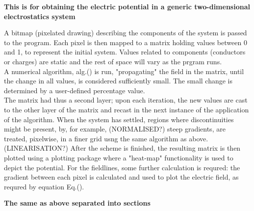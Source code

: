 \documentclass{article}
\begin{document}
  \noindent\textbf{This is for obtaining the electric potential in a generic two-dimensional electrostatics system}

  \vspace{5mm}

	A bitmap (pixelated drawing) describing the components of the system is passed to the program. Each pixel is then 
	 mapped to a matrix holding values between 0 and 1, to represent the initial system. Values related to components
	 (conductors or charges) are static and the rest of space will vary as the prgram runs.\\
	A numerical algorithm, alg.() is run, "propagating" the field in the matrix, until the change in all values, is 
	 considered sufficiently small. The small change is determined by a user-defined percentage value. \\
	The matrix had thus a second layer; upon each iteration, the new values are cast to the other layer of the 
	 matrix and recast in the next instance of the application of the algorithm. 
	When the system has settled, regions where discontinuities might be present, by, for example, (NORMALISED?)
	 steep gradients, are treated, pixelwise, in a finer grid usng the same algorithm as above. (LINEARISATION?)
	After the scheme is finished, the resulting matrix is then plotted using a plotting package where  a "heat-map" 
	 functionality is used to depict the potential. For the fieldlines, some further calculation is requred: the 
	 gradient between each pixel is calculated and used to plot the electric field, as requred by equation Eq.().

\vspace{7.5mm}

\noindent\textbf{The same as above separated into sections}

\vspace{5mm}
\end{document}
